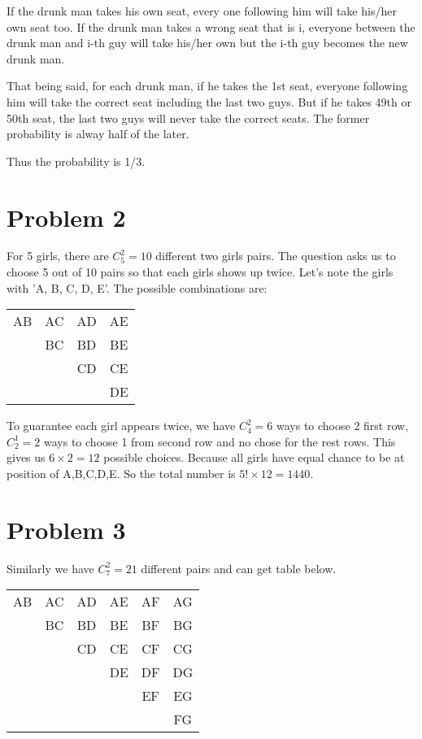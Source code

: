 \documentclass[12pt]{amsart}
\begin{document}
If the drunk man takes his own seat, every one following him will take his/her own seat too. If the drunk man takes a wrong seat that is i, everyone between the drunk man and i-th guy will take his/her own but the i-th guy becomes the new drunk man.

That being said, for each drunk man, if he takes the 1st seat, everyone following him will take the correct seat including the last two guys. But if he takes 49th or 50th seat, the last two guys will never take the correct seats. The former probability is alway half of the later.

Thus the probability is 1/3. 

\section{Problem 2}

For 5 girls, there are $C_5^2 = 10$ different two girls pairs. The question asks us to choose 5 out of 10 pairs so that each girls shows up twice. Let's note the girls with 'A, B, C, D, E'. The possible combinations are:

\begin{center}
\begin{tabular}{cccc}
\hline
\hline
AB & AC & AD & AE  \\
   & BC & BD & BE  \\
   &    & CD & CE  \\
   &    &    & DE  \\
\hline
\end{tabular}
\end{center}

To guarantee each girl appears twice, we have $C_4^2=6$ ways to choose 2 first row, $C_2^1=2$ ways to choose 1 from second row and no chose for the rest rows. This gives us $6\times 2=12$ possible choices. Because all girls have equal chance to be at position of A,B,C,D,E. So the total number is $5! \times 12 = 1440$.

\section{Problem 3}
Similarly we have $C_7^2 = 21$ different pairs and can get table below.
\begin{center}
\begin{tabular}{cccccc}
\hline
\hline
AB & AC & AD & AE & AF & AG \\
   & BC & BD & BE & BF & BG \\
   &    & CD & CE & CF & CG \\
   &    &    & DE & DF & DG \\
   &    &    &    & EF & EG \\
   &    &    &    &    & FG \\
\hline
\end{tabular}
\end{center}
\end{document}

